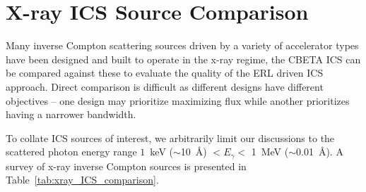 \documentclass[../main.tex]{subfiles}
\begin{document}
\section{X-ray ICS Source Comparison}
\label{sec:xray_ICS_comparison}

Many inverse Compton scattering sources driven by a variety of accelerator types have been designed and built to operate in the x-ray regime, the CBETA ICS can be compared against these to evaluate the quality of the ERL driven ICS approach. Direct comparison is difficult as different designs have different objectives -- one design may prioritize maximizing flux while another prioritizes having a narrower bandwidth.

To collate ICS sources of interest, we arbitrarily limit our discussions to the scattered photon energy range $1$~\si{\kilo\electronvolt} ($\sim$10~\si{\angstrom}) $< E_{\gamma} <$ 1~\si{\mega\electronvolt} ($\sim$0.01~\si{\angstrom}). A survey of x-ray inverse Compton sources is presented in Table~\ref{tab:xray_ICS_comparison}.
\end{document}
